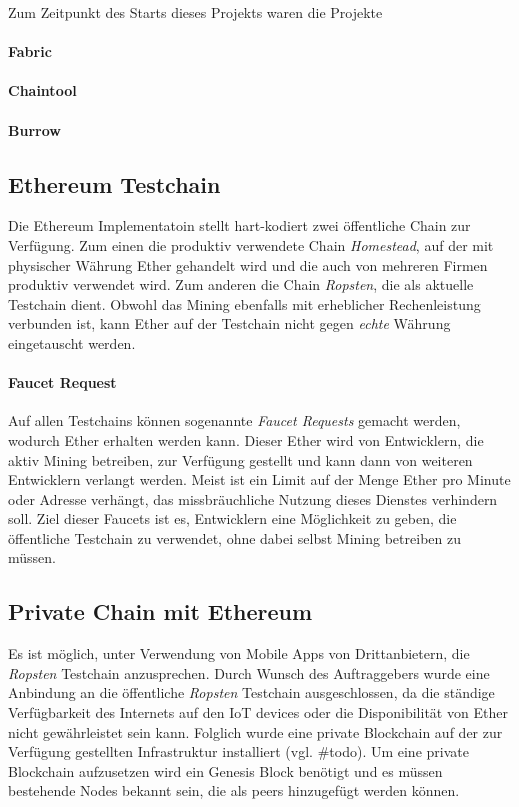 Zum Zeitpunkt des Starts dieses Projekts waren die Projekte 
\paragraph{Fabric}
\paragraph{Chaintool}
\paragraph{Burrow}

\subsection{Ethereum Testchain}
Die Ethereum Implementatoin stellt hart-kodiert zwei öffentliche Chain zur Verfügung. Zum einen die produktiv verwendete Chain \emph{Homestead}, auf der mit physischer Währung Ether gehandelt wird\cite[{Kapitel Ether}]{ethereum-homestead.readthedocs.io} und die auch von mehreren Firmen produktiv verwendet wird. Zum anderen die Chain \emph{Ropsten}, die als aktuelle Testchain dient. Obwohl das Mining ebenfalls mit erheblicher Rechenleistung verbunden ist, kann Ether auf der Testchain nicht gegen \emph{echte} Währung eingetauscht werden.

\paragraph{Faucet Request}
\label{para:Faucet_Request}
Auf allen Testchains können sogenannte \emph{Faucet Requests} gemacht werden, wodurch Ether erhalten werden kann. Dieser Ether wird von Entwicklern, die aktiv Mining betreiben, zur Verfügung gestellt und kann dann von weiteren Entwicklern verlangt werden. Meist ist ein Limit auf der Menge Ether pro Minute oder Adresse verhängt, das missbräuchliche Nutzung dieses Dienstes verhindern soll. Ziel dieser Faucets ist es, Entwicklern eine Möglichkeit zu geben, die öffentliche Testchain zu verwendet, ohne dabei selbst Mining betreiben zu müssen.\cite{blog.b9lab.com/faucet,ethereum.stackexchange.com/faucets}

\subsection{Private Chain mit Ethereum}
Es ist möglich, unter Verwendung von Mobile Apps von Drittanbietern, die \emph{Ropsten} Testchain anzusprechen\cite[Features]{status.im}. Durch Wunsch des Auftraggebers wurde eine Anbindung an die öffentliche \emph{Ropsten} Testchain ausgeschlossen, da die ständige Verfügbarkeit des Internets auf den IoT devices oder die Disponibilität von Ether nicht gewährleistet sein kann. Folglich wurde eine private Blockchain auf der zur Verfügung gestellten Infrastruktur installiert (vgl. \#todo). Um eine private Blockchain aufzusetzen wird ein Genesis Block benötigt und es müssen bestehende Nodes bekannt sein, die als peers hinzugefügt werden können.

